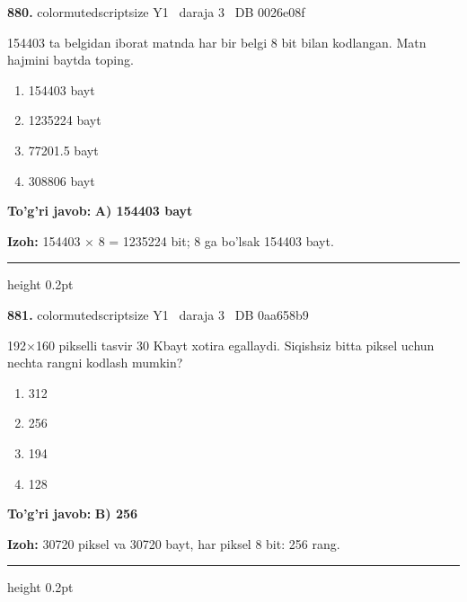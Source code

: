 \documentclass[10pt,a4paper,oneside]{article}
\begin{document}
\noindent\textbf{\color{ink}880.}  {color{muted}scriptsize Y1 \textbullet\ daraja 3 \textbullet\ DB 0026e08f}
\par
154403 ta belgidan iborat matnda har bir belgi 8 bit bilan kodlangan. Matn hajmini baytda toping.
\begin{enumerate}[label=\Alph*),leftmargin=9mm]
\item 154403 bayt
\item 1235224 bayt
\item 77201.5 bayt
\item 308806 bayt
\end{enumerate}
\begin{tcolorbox}[enhanced,breakable,colback=teal!4,colframe=teal!50!black,boxrule=0.5pt,arc=1.1mm,left=3mm,right=3mm,top=1.7mm,bottom=1.7mm,before skip=2mm,after skip=2mm]
\textbf{\color{teal}To'g'ri javob:} \textbf{A) 154403 bayt}
\par\smallskip
\textbf{Izoh:} 154403 \ensuremath{\times} 8 = 1235224 bit; 8 ga bo'lsak 154403 bayt.
\end{tcolorbox}
\vspace{2mm}\hrule height 0.2pt \vspace{3mm}

\noindent\textbf{\color{ink}881.}  {color{muted}scriptsize Y1 \textbullet\ daraja 3 \textbullet\ DB 0aa658b9}
\par
192\ensuremath{\times}160 pikselli tasvir 30 Kbayt xotira egallaydi. Siqishsiz bitta piksel uchun nechta rangni kodlash mumkin?
\begin{enumerate}[label=\Alph*),leftmargin=9mm]
\item 312
\item 256
\item 194
\item 128
\end{enumerate}
\begin{tcolorbox}[enhanced,breakable,colback=teal!4,colframe=teal!50!black,boxrule=0.5pt,arc=1.1mm,left=3mm,right=3mm,top=1.7mm,bottom=1.7mm,before skip=2mm,after skip=2mm]
\textbf{\color{teal}To'g'ri javob:} \textbf{B) 256}
\par\smallskip
\textbf{Izoh:} 30720 piksel va 30720 bayt, har piksel 8 bit: 256 rang.
\end{tcolorbox}
\vspace{2mm}\hrule height 0.2pt \vspace{3mm}
\end{document}
